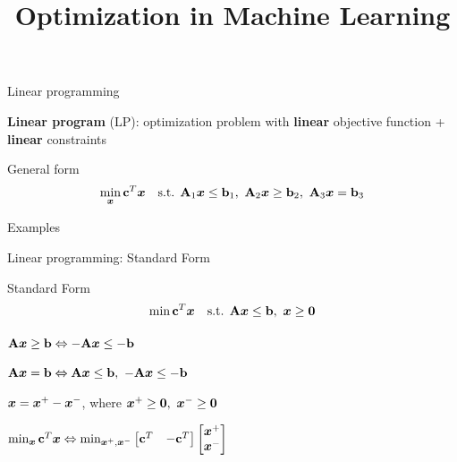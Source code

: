 \documentclass[11pt,compress,t,notes=noshow, xcolor=table]{beamer}
\title{Optimization in Machine Learning}
\begin{document}

\begin{framei}{Linear programming}
\item \textbf{Linear program} (LP): optimization problem with \textbf{linear} objective function + \textbf{linear} constraints
\item General form
$$
\min_{\bm{x}} \mathbf{c}^T\bm{x} \quad \text{s.t. } \mathbf{A}_1\bm{x} \le \mathbf{b}_1,\ \mathbf{A}_2\bm{x} \ge \mathbf{b}_2,\ \mathbf{A}_3\bm{x} = \mathbf{b}_3
$$
\item Examples
\end{framei}


\begin{framei}{Linear programming: Standard Form}
\item[] Standard Form
$$
\min \mathbf{c}^T\bm{x} \quad \text{s.t. } \mathbf{A}\bm{x} \le \mathbf{b},\ \bm{x} \ge \mathbf{0}
$$
\item $\mathbf{A}\bm{x} \ge \mathbf{b} \Leftrightarrow -\mathbf{A}\bm{x} \le -\mathbf{b}$
\item $\mathbf{A}\bm{x} = \mathbf{b} \Leftrightarrow \mathbf{A}\bm{x} \le \mathbf{b},\ -\mathbf{A}\bm{x} \le -\mathbf{b}$
\item $\bm{x} = \bm{x}^+ - \bm{x}^-$, where $\bm{x}^+ \ge \mathbf{0},\ \bm{x}^- \ge \mathbf{0}$
\item $\min_{\bm{x}} \mathbf{c}^T\bm{x} \Leftrightarrow \min_{\bm{x}^+, \bm{x}^-} \begin{bmatrix} \mathbf{c}^T & -\mathbf{c}^T \end{bmatrix} \begin{bmatrix} \bm{x}^+ \\ \bm{x}^- \end{bmatrix}$
\end{framei}
\end{document}
